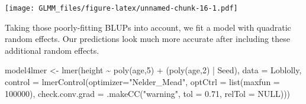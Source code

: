 \documentclass[
]{book}
\newenvironment{Shaded}{\begin{snugshade}}{\end{snugshade}}
\newcommand{\AttributeTok}[1]{\textcolor[rgb]{0.77,0.63,0.00}{#1}}
\newcommand{\ConstantTok}[1]{\textcolor[rgb]{0.00,0.00,0.00}{#1}}
\newcommand{\DecValTok}[1]{\textcolor[rgb]{0.00,0.00,0.81}{#1}}
\newcommand{\FloatTok}[1]{\textcolor[rgb]{0.00,0.00,0.81}{#1}}
\newcommand{\FunctionTok}[1]{\textcolor[rgb]{0.00,0.00,0.00}{#1}}
\newcommand{\NormalTok}[1]{#1}
\newcommand{\OtherTok}[1]{\textcolor[rgb]{0.56,0.35,0.01}{#1}}
\newcommand{\SpecialCharTok}[1]{\textcolor[rgb]{0.00,0.00,0.00}{#1}}
\newcommand{\StringTok}[1]{\textcolor[rgb]{0.31,0.60,0.02}{#1}}
\begin{document}
\begin{Shaded}
\end{Shaded}

\texttt{[image: GLMM\_files/figure-latex/unnamed-chunk-16-1.pdf]}

Taking those poorly-fitting BLUPs into account, we fit a model with quadratic random effects. Our predictions look much more accurate after including these additional random effects.

\begin{Shaded}
\begin{Highlighting}[]
\NormalTok{model4lmer }\OtherTok{\textless{}{-}} \FunctionTok{lmer}\NormalTok{(height }\SpecialCharTok{\textasciitilde{}} \FunctionTok{poly}\NormalTok{(age,}\DecValTok{5}\NormalTok{) }\SpecialCharTok{+}\NormalTok{ (}\FunctionTok{poly}\NormalTok{(age,}\DecValTok{2}\NormalTok{) }\SpecialCharTok{|}\NormalTok{ Seed), }\AttributeTok{data =}\NormalTok{ Loblolly, }\AttributeTok{control =} \FunctionTok{lmerControl}\NormalTok{(}\AttributeTok{optimizer=}\StringTok{"Nelder\_Mead"}\NormalTok{, }\AttributeTok{optCtrl =} \FunctionTok{list}\NormalTok{(}\AttributeTok{maxfun =} \DecValTok{100000}\NormalTok{), }\AttributeTok{check.conv.grad =} \FunctionTok{.makeCC}\NormalTok{(}\StringTok{"warning"}\NormalTok{, }\AttributeTok{tol =} \FloatTok{0.71}\NormalTok{, }\AttributeTok{relTol =} \ConstantTok{NULL}\NormalTok{)))}
\end{Highlighting}
\end{Shaded}
\end{document}
